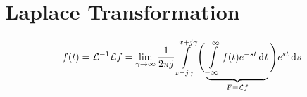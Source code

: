 \section{Laplace Transformation}
\[
  f(t) = \mathcal{L}^{-1} \mathcal{L} f =
    \lim_{\gamma\to\infty} \frac{1}{2\pi j} \int\limits_{x - j\gamma}^{x + j\gamma}
      \Bigg(
      \underbrace{
        \int\limits_{-\infty}^{\infty} f(t) e^{-st} \,\mathrm{d}^{} t
      }_{F = \mathcal{L} f}
      \Bigg)
    e^{st} \,\mathrm{d}^{} s
\]
